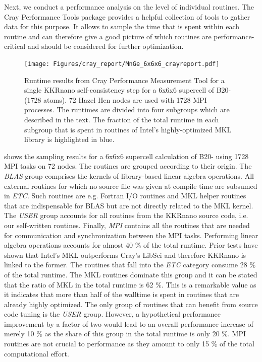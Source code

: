 \documentclass[graybox]{svmult}
\begin{document}
Next, we conduct a performance analysis on the level of individual routines.
The Cray Performance Tools package provides a helpful collection of tools to gather data for this purpose.
It allows to sample the time that is spent within each routine and can therefore give a good
picture of which routines are performance-critical and should be considered for further optimization.
\begin{figure}[htb]
\begin{center}
 \texttt{[image: Figures/cray\_report/MnGe\_6x6x6\_crayreport.pdf]}
\end{center}
	\caption{Runtime results from Cray Performance Measurement 
	Tool for a single KKRnano self-consistency step 
	for a 6x6x6 supercell of B20- (1728 atoms). 72 Hazel Hen nodes are used with 1728 MPI processes.
	The runtimes are divided into four subgroups which are described in the text.
	The fraction of the total runtime in each subgroup that is spent in
	routines of Intel's highly-optimized MKL library is highlighted in blue.
	}
\label{fig:MnGe_6x6x6_crayreport}
\end{figure}
 shows the sampling results for a 6x6x6 supercell calculation
of B20- using 1728 MPI tasks on 72 nodes.
The routines are grouped according to their origin. The \textit{BLAS} group comprises the kernels of
library-based linear algebra operations. 
All external routines for which no source file was given at compile time are subsumed
in \textit{ETC}. Such routines are e.g. Fortran I/O routines and MKL helper routines
that are indispensable for BLAS but are not directly related
to the MKL kernel.
The \textit{USER} group accounts for all routines from the KKRnano source code, i.e. our self-written routines.
Finally, \textit{MPI} contains all the routines that are needed for communication and synchronization
between the MPI tasks. 
Performing linear algebra operations accounts for almost 40 \% of the total runtime. Prior tests have shown that
Intel's MKL outperforms Cray's LibSci and therefore KKRnano is linked to the former.
The routines that fall into the \textit{ETC} category consume 28 \% of the total runtime. 
The MKL routines dominate this group and it can be stated that the ratio of MKL in the total runtime is 62 \%.
This is a remarkable value as it indicates that more than half of the walltime is spent in routines
that are already highly optimized.
The only group of routines that can benefit from source code tuning is the \textit{USER} group.
However, a hypothetical performance improvement by a factor of two would lead to
an overall performance increase of merely 10 \% as the share of this group in the total runtime is only 20 \%.
MPI routines are not crucial to performance as they amount to only 15 \% of the total
computational effort.
\end{document}
